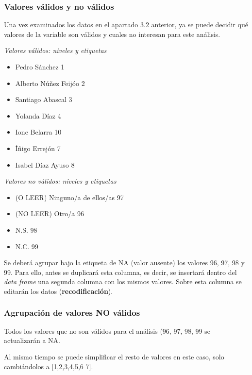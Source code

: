 \documentclass[
  12 pt,
  a4paper,
]{article}
\providecommand{\tightlist}{%
  \setlength{\itemsep}{0pt}\setlength{\parskip}{0pt}}
\begin{document}
\hypertarget{valores-vuxe1lidos-y-no-vuxe1lidos}{%
\subsubsection{Valores válidos y no
válidos}\label{valores-vuxe1lidos-y-no-vuxe1lidos}}

Una vez examinados los datos en el apartado 3.2 anterior, ya se puede
decidir qué valores de la variable son válidos y cuales no interesan
para este análisis.

\emph{Valores válidos: niveles y etiquetas}

\begin{itemize}
\tightlist
\item
  Pedro Sánchez 1
\item
  Alberto Núñez Feijóo 2
\item
  Santiago Abascal 3
\item
  Yolanda Díaz 4
\item
  Ione Belarra 10
\item
  Íñigo Errejón 7
\item
  Isabel Díaz Ayuso 8
\end{itemize}

\emph{Valores no válidos: niveles y etiquetas}

\begin{itemize}
\tightlist
\item
  (O LEER) Ninguno/a de ellos/as 97
\item
  (NO LEER) Otro/a 96
\item
  N.S. 98
\item
  N.C. 99
\end{itemize}

Se deberá agrupar bajo la etiqueta de NA (valor ausente) los valores 96,
97, 98 y 99. Para ello, antes se duplicará esta columna, es decir, se
insertará dentro del \emph{data frame} una segunda columna con los
mismos valores. Sobre esta columna se editarán los datos
(\textbf{recodificación}).

\hypertarget{agrupaciuxf3n-de-valores-no-vuxe1lidos}{%
\subsubsection{Agrupación de valores NO
válidos}\label{agrupaciuxf3n-de-valores-no-vuxe1lidos}}

Todos los valores que no son válidos para el análisis (96, 97, 98, 99 se
actualizarán a NA.

Al mismo tiempo se puede simplificar el resto de valores en este caso,
solo cambiándolos a {[}1,2,3,4,5,6 7{]}.
\end{document}
